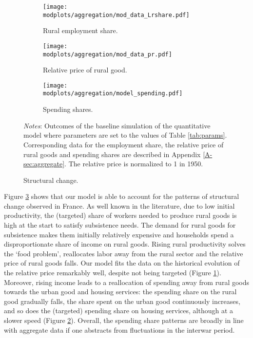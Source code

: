 \documentclass[./20250130-paper.tex]{subfiles}
\begin{document}
\begin{figure}[h!]
	\begin{adjustbox}{center}
		\begin{subfigure}{\pthree\textwidth}
			\texttt{[image: \\modplots/aggregation/mod\_data\_Lrshare.pdf]}
			\caption{Rural employment share.}
		\end{subfigure}
		\begin{subfigure}{\pthree\textwidth}
			\texttt{[image: \\modplots/aggregation/mod\_data\_pr.pdf]}
			\caption{Relative price of rural good.\label{fig:model-relativeprice}} 
		\end{subfigure}
		\begin{subfigure}{\pthree\textwidth}
			\texttt{[image: \\modplots/aggregation/model\_spending.pdf]}
			\caption{Spending shares.\label{fig:model-spending}} 
		\end{subfigure}
	\end{adjustbox}
	\caption{Structural change. \label{fig:model-stchange}}
	
	{\footnotesize \textit{Notes}: Outcomes of the baseline simulation of the quantitative model where parameters are set to the values of Table \ref{tab:params}. Corresponding data for the employment share, the relative price of rural goods and spending shares are described in Appendix \ref{A-sec:aggregate}. The relative price is normalized to 1 in 1950.}
\end{figure}


 Figure \ref{fig:model-stchange} shows that our model is able to account for the patterns of structural change observed in France. As well known in the literature, due to low initial productivity, the (targeted) share of workers needed to produce rural goods is high at the start to satisfy subsistence needs. The demand for rural goods for subsistence makes them initially relatively expensive and households spend a disproportionate share of income on rural goods. Rising rural productivity solves the `food problem', reallocates labor away from the rural sector and the relative price of rural goods falls. Our model fits the data on the historical evolution of the relative price remarkably well, despite not being targeted (Figure \ref{fig:model-relativeprice}). Moreover, rising income leads to a reallocation of spending away from rural goods towards the urban good and housing services: the spending share on the rural good gradually falls, the share spent on the urban good continuously increases, and so does the (targeted) spending share on housing services, although at a slower speed (Figure \ref{fig:model-spending}). Overall, the spending share patterns are broadly in line with aggregate data if one abstracts from fluctuations in the interwar period.
\end{document}
